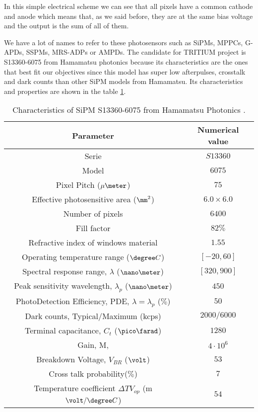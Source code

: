 In this simple electrical scheme we can see that all pixels have a common cathode and anode which means that, as we said before, they are at the same bias voltage and the output is the sum of all of them.

We have a lot of names to refer to these photosensors such as SiPMs, MPPCs, G-APDs, SSPMs, MRS-ADPs or AMPDs. The candidate for TRITIUM project is S13360-6075 from Hamamatsu photonics \cite{DataSheetHammamatsu_1_SiPM_75} because its characteristics are the ones that best fit our objectives since this model has super low afterpulses, crosstalk and dark counts than other SiPM models from Hamamatsu. Its characteristics and properties are shown in the table \ref{tab:PropertiesOfSiPM75}. 

\begin{table}[htbp]
\begin{center}
\begin{tabular}{|c|c|}
\hline
Parameter & Numerical value \\
\hline \hline \hline
Serie & $S13360$ \\ \hline
Model & $6075$ \\ \hline
Pixel Pitch ($\mu\meter$) & $75$ \\ \hline
Effective photosensitive area ($\mm^2$) & $6.0 \times 6.0$ \\ \hline
Number of pixels & $6400$ \\ \hline
Fill factor & $82\%$ \\ \hline
Refractive index of windows material & $1.55$ \\ \hline
Operating temperature range ($\degree C$)& $[-20,60]$ \\ \hline
Spectral response range, $\lambda$ ($\nano\meter$) & $[320, 900]$ \\ \hline
Peak sensitivity wavelength, $\lambda_p$ ($\nano\meter$) & $450$ \\ \hline
PhotoDetection Efficiency, PDE, $\lambda=\lambda_p$ ($\%$) & $50$ \\ \hline
Dark counts, Typical/Maximum (kcps) & $2000/6000$ \\ \hline
Terminal capacitance, $C_t$ ($\pico\farad$) & $1280$ \\ \hline
Gain, M, & $4 \cdot{} 10^6$ \\ \hline
Breakdown Voltage, $V_{BR}$ ($\volt$) & $53$ \\ \hline
Cross talk probability($\%$) & $7$ \\ \hline
Temperature coefficient $\Delta TV_{op}$ (m$\volt/\degree C$) & $54$ \\ \hline
\end{tabular}
\caption{Characteristics of SiPM S13360-6075 from Hamamatsu Photonics \cite{DataSheetHammamatsu_1_SiPM_75}.}
\label{tab:PropertiesOfSiPM75}
\end{center}
\end{table}

